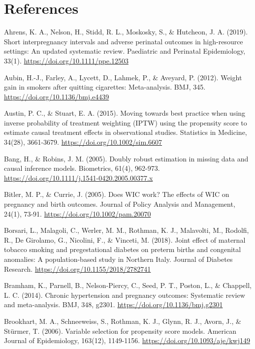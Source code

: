 \documentclass[11pt,letterpaper]{article}
\begin{document}
\section*{References}
{\small\setlength{\parindent}{-0.25in}\setlength{\leftskip}{0.25in}\setlength{\parskip}{3pt}
Ahrens, K. A., Nelson, H., Stidd, R. L., Moskosky, S., \& Hutcheon, J. A. (2019). Short interpregnancy intervals and adverse perinatal outcomes in high-resource settings: An updated systematic review. Paediatric and Perinatal Epidemiology, 33(1). \url{https://doi.org/10.1111/ppe.12503}

Aubin, H.-J., Farley, A., Lycett, D., Lahmek, P., \& Aveyard, P. (2012). Weight gain in smokers after quitting cigarettes: Meta-analysis. BMJ, 345. \url{https://doi.org/10.1136/bmj.e4439}

Austin, P. C., \& Stuart, E. A. (2015). Moving towards best practice when using inverse probability of treatment weighting (IPTW) using the propensity score to estimate causal treatment effects in observational studies. Statistics in Medicine, 34(28), 3661-3679. \url{https://doi.org/10.1002/sim.6607}

Bang, H., \& Robins, J. M. (2005). Doubly robust estimation in missing data and causal inference models. Biometrics, 61(4), 962-973. \url{https://doi.org/10.1111/j.1541-0420.2005.00377.x}

Bitler, M. P., \& Currie, J. (2005). Does WIC work? The effects of WIC on pregnancy and birth outcomes. Journal of Policy Analysis and Management, 24(1), 73-91. \url{https://doi.org/10.1002/pam.20070}

Borsari, L., Malagoli, C., Werler, M. M., Rothman, K. J., Malavolti, M., Rodolfi, R., De Girolamo, G., Nicolini, F., \& Vinceti, M. (2018). Joint effect of maternal tobacco smoking and pregestational diabetes on preterm births and congenital anomalies: A population-based study in Northern Italy. Journal of Diabetes Research. \url{https://doi.org/10.1155/2018/2782741}

Bramham, K., Parnell, B., Nelson-Piercy, C., Seed, P. T., Poston, L., \& Chappell, L. C. (2014). Chronic hypertension and pregnancy outcomes: Systematic review and meta-analysis. BMJ, 348, g2301. \url{https://doi.org/10.1136/bmj.g2301}

Brookhart, M. A., Schneeweiss, S., Rothman, K. J., Glynn, R. J., Avorn, J., \& Stürmer, T. (2006). Variable selection for propensity score models. American Journal of Epidemiology, 163(12), 1149-1156. \url{https://doi.org/10.1093/aje/kwj149}

}
\end{document}
